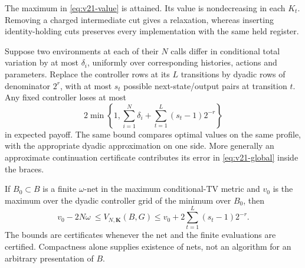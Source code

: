\begin{theorem}\label{thm:v21-transfer}
The maximum in \eqref{eq:v21-value} is attained. Its value is
nondecreasing in each $K_t$. Removing a charged intermediate cut gives
a relaxation, whereas inserting identity-holding cuts preserves every
implementation with the same held register.

Suppose two environments at each of their $N$ calls differ in conditional
total variation by at most $\delta_i$, uniformly over corresponding
histories, actions and parameters. Replace the controller rows at its
$L$ transitions by dyadic rows of denominator $2^r$, with at most $s_t$
possible next-state/output pairs at transition $t$. Any fixed controller
loses at most
\begin{equation}\label{eq:v21-budget}
 2\min\left\{1,\sum_{i=1}^N\delta_i+
                         \sum_{t=1}^L(s_t-1)2^{-r}\right\}
\end{equation}
in expected payoff. The same bound compares optimal values on the same
profile, with the appropriate dyadic approximation on one side.
More generally an approximate continuation certificate contributes its
error in \eqref{eq:v21-global} inside the braces.

If $B_0\subset B$ is a finite $\omega$-net in the maximum conditional-TV
metric and $v_0$ is the maximum over the dyadic controller grid of the
minimum over $B_0$, then
\begin{equation}\label{eq:v21-sandwich}
 v_0-2N\omega\ \le V_{N,\mathbf K}(B,G)
 \le v_0+2\sum_{t=1}^L(s_t-1)2^{-r}.
\end{equation}
The bounds are certificates whenever the net and the finite evaluations
are certified. Compactness alone supplies existence of nets, not an
algorithm for an arbitrary presentation of $B$.
\end{theorem}
